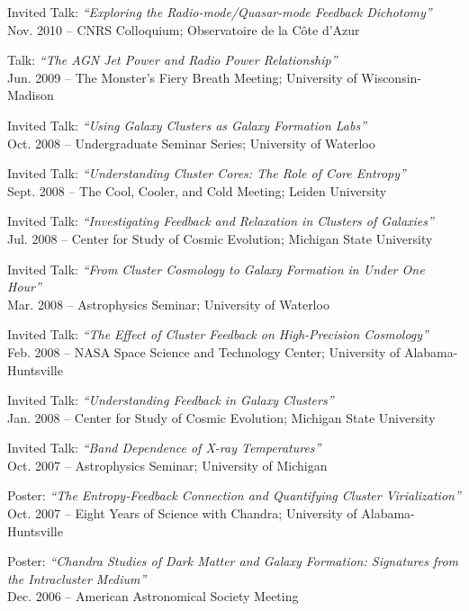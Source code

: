 \documentclass[11pt]{cv}
\begin{document}
\begin{llist}

{\sc Invited Talk: {\textit{``Exploring the Radio-mode/Quasar-mode Feedback Dichotomy''}}}\\
Nov. 2010 -- CNRS Colloquium; Observatoire de la C\^ote d'Azur

{\sc Talk: {\textit{``The AGN Jet Power and Radio Power Relationship''}}}\\
Jun. 2009 -- The Monster's Fiery Breath Meeting; University of Wisconsin-Madison

{\sc Invited Talk: {\textit{``Using Galaxy Clusters as Galaxy Formation Labs''}}}\\
Oct. 2008 -- Undergraduate Seminar Series; University of Waterloo

{\sc Invited Talk: {\textit{``Understanding Cluster Cores: The Role of Core Entropy''}}}\\
Sept. 2008 -- The Cool, Cooler, and Cold Meeting; Leiden University

{\sc Invited Talk: {\textit{``Investigating Feedback and Relaxation in Clusters of Galaxies''}}}\\
Jul. 2008 -- Center for Study of Cosmic Evolution; Michigan State University

{\sc Invited Talk: {\textit{``From Cluster Cosmology to Galaxy Formation in Under One Hour''}}}\\
Mar. 2008 -- Astrophysics Seminar; University of Waterloo

{\sc Invited Talk: {\textit{``The Effect of Cluster Feedback on High-Precision Cosmology''}}}\\
Feb. 2008 -- NASA Space Science and Technology Center; University of Alabama-Huntsville

{\sc Invited Talk: {\textit{``Understanding Feedback in Galaxy Clusters''}}}\\
Jan. 2008 -- Center for Study of Cosmic Evolution; Michigan State University

{\sc Invited Talk: {\textit{``Band Dependence of X-ray Temperatures''}}}\\
Oct. 2007 -- Astrophysics Seminar; University of Michigan

{\sc Poster: {\textit{``The Entropy-Feedback Connection and Quantifying Cluster Virialization''}}}\\
Oct. 2007 -- Eight Years of Science with Chandra; University of Alabama-Huntsville

{\sc Poster: {\textit{``Chandra Studies of Dark Matter and Galaxy Formation: Signatures from the Intracluster Medium''}}}\\
Dec. 2006 -- American Astronomical Society Meeting


\end{llist}
\end{document}
